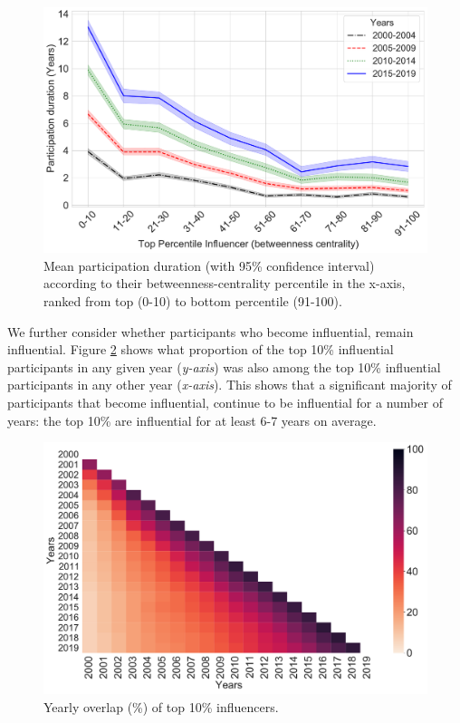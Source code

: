 \documentclass[twocolumn,10pt]{article}
\newlength{\figureWidthOneColumn}
\begin{document}
\begin{figure}
  \centering
  \includegraphics[width=\figureWidthOneColumn]{figures-prev/icwsm-2022/lineplot_age_top_percentile.pdf}
  \caption{
    Mean participation duration (with 95\% confidence interval) according
    to their betweenness-centrality percentile in the x-axis, ranked from
    top (0-10) to bottom percentile (91-100).
  }
  \label{fig:age_top_percentile}
\end{figure}

We further consider whether participants who become influential, remain
influential. Figure \ref{fig:heatmap_top10_overlap} shows what proportion
of the top 10\% influential participants in any given year (\emph{y-axis})
was also among the top 10\% influential participants in any other year
(\emph{x-axis}). This shows that a significant majority of participants
that become influential, continue to be influential for a number of years:
the top 10\% are influential for at least 6-7 years on average.

\begin{figure}
  \centering
  \includegraphics[width=\figureWidthOneColumn]{figures-prev/icwsm-2022/heatmap_top10_percent_overlap.pdf}
  \caption{
    Yearly overlap (\%) of top 10\% influencers.
  }
  \label{fig:heatmap_top10_overlap}
\end{figure}
\end{document}
